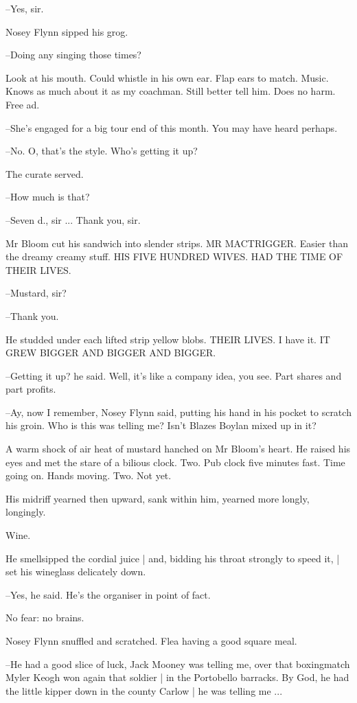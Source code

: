 --Yes,
sir.

Nosey Flynn sipped his grog.

--Doing any singing those times?

Look at his mouth.
Could whistle in his own ear.
Flap ears to match.
Music.
Knows as much about it as my coachman.
Still better tell him.
Does no harm.
Free ad.

--She's engaged for a big tour end of this month.
You may have heard perhaps.

--No.
O, that's the style.
Who's getting it up?

The curate served.

--How much is that?

--Seven d., sir ...
Thank you, sir.

Mr Bloom cut his sandwich into slender strips.
MR MACTRIGGER.
Easier than the dreamy creamy stuff.
HIS FIVE HUNDRED WIVES.
HAD THE TIME OF THEIR LIVES.

--Mustard, sir?

--Thank you.

He studded under each lifted strip yellow blobs.
THEIR LIVES.
I have it.
IT GREW BIGGER AND BIGGER AND BIGGER.

--Getting it up?
he said.
Well, it's like a company idea, you see.
Part shares and part profits.

--Ay, now I remember,
Nosey Flynn said,
putting his hand in his pocket to scratch his groin.
Who is this was telling me?
Isn't Blazes Boylan mixed up in it?

A warm shock of air heat of mustard hanched on Mr Bloom's heart.
He raised his eyes and met the stare of a bilious clock.
Two.
Pub clock five minutes fast.
Time going on.
Hands moving.
Two.
Not yet.

His midriff yearned then upward,
sank within him,
yearned more longly,
longingly.

Wine.

He smellsipped the cordial juice |
and, bidding his throat strongly to speed it, |
set his wineglass delicately down.

--Yes,
he said.
He's the organiser in point of fact.

No fear:
no brains.

Nosey Flynn snuffled and scratched.
Flea having a good square meal.

--He had a good slice of luck,
Jack Mooney was telling me,
over that boxingmatch Myler Keogh won again that soldier |
in the Portobello barracks.
By God,
he had the little kipper down in the county Carlow |
he was telling me ...

